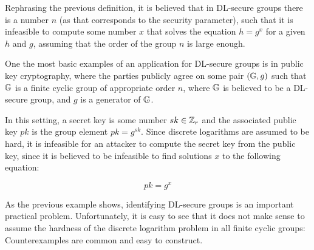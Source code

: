 Rephrasing the previous definition, it is believed that in DL-secure groups there is a number $n$ (as that corresponds to the security parameter), such that it is infeasible to compute some number $x$ that solves the equation $h=g^x$ for a given $h$ and $g$, assuming that the order of the group $n$ is large enough.

\begin{example}

One the most basic examples of an application for DL-secure groups is in public key cryptography, where the parties publicly agree on some pair $(\mathbb{G},g)$  such that $\mathbb{G}$ is a finite cyclic group of appropriate order $n$, where $\mathbb{G}$ is believed to be a DL-secure group, and $g$ is a generator of $\mathbb{G}$.

In this setting, a secret key is some number $sk \in \mathbb{Z}_r$ and the associated public key $pk$ is the group element $pk=g^{sk}$. Since discrete logarithms are assumed to be hard, it is infeasible for an attacker to compute the secret key from the public key, since it is believed to be infeasible to find solutions $x$ to the following equation:

\begin{equation}
pk = g^{x}
\end{equation}

\end{example}

As the previous example shows, identifying DL-secure groups is an important practical problem. Unfortunately, it is easy to see that it does not make sense to assume the hardness of the discrete logarithm problem in all finite cyclic groups: Counterexamples are common and easy to construct.

